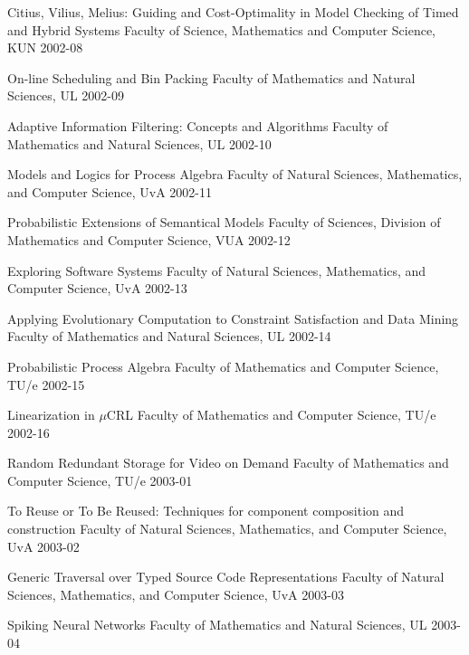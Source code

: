 \begin{multicols}{2}
         {Citius, Vilius, Melius: Guiding and Cost-Optimality in Model Checking of Timed and Hybrid Systems}
         {Faculty of Science, Mathematics and Computer Science, KUN}
         {2002-08}

         {On-line Scheduling and Bin Packing}
         {Faculty of Mathematics and Natural Sciences, UL}
         {2002-09}

     {Adaptive Information Filtering: Concepts and Algorithms}
         {Faculty of Mathematics and Natural Sciences, UL}
         {2002-10}

     {Models and Logics for Process Algebra}
         {Faculty of Natural Sciences, Mathematics, and Computer
          Science, UvA}
         {2002-11}

     {Probabilistic Extensions of Semantical Models}
         {Faculty of Sciences, Division of Mathematics and Computer Science, VUA}
         {2002-12}

     {Exploring Software Systems}
         {Faculty of Natural Sciences, Mathematics, and Computer
          Science, UvA}
         {2002-13}

     {Applying Evolutionary Computation to Constraint Satisfaction and
          Data Mining}
         {Faculty of Mathematics and Natural Sciences, UL}
         {2002-14}

     {Probabilistic Process Algebra}
         {Faculty of Mathematics and Computer Science, TU/e}
         {2002-15}

     {Linearization in $\mu$CRL}
         {Faculty of Mathematics and Computer Science, TU/e}
         {2002-16}

     {Random Redundant Storage for Video on Demand}
         {Faculty of Mathematics and Computer Science, TU/e}
         {2003-01}

     {To Reuse or To Be Reused: Techniques for component composition and construction}
         {Faculty of Natural Sciences, Mathematics, and Computer
          Science, UvA}
         {2003-02}

     {Generic Traversal over Typed Source Code Representations}
         {Faculty of Natural Sciences, Mathematics, and Computer
          Science, UvA}
         {2003-03}

     {Spiking Neural Networks}
         {Faculty of Mathematics and Natural Sciences, UL}
         {2003-04}


\end{multicols}
